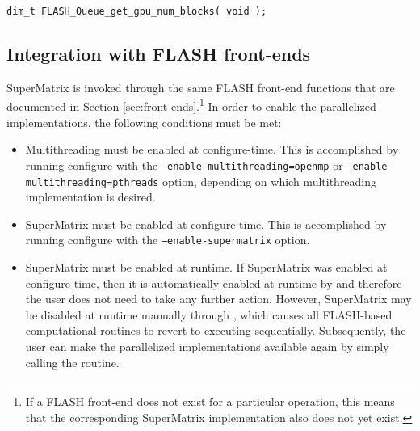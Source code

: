 
\begin{flaspec}
\begin{verbatim}
dim_t FLASH_Queue_get_gpu_num_blocks( void );
\end{verbatim}
\end{flaspec}







\subsection{Integration with FLASH front-ends}


SuperMatrix is invoked through the same FLASH front-end functions that
are documented in Section \ref{sec:front-ends}.\footnote{If a FLASH front-end
does not exist for a particular operation, this means that the corresponding
SuperMatrix implementation also does not yet exist.}
In order to enable the parallelized implementations, the following
conditions must be met:
\begin{itemize}

\item
Multithreading must be enabled at configure-time.
This is accomplished by running configure with the
{\tt --enable-multithreading=openmp} or
{\tt --enable-multithreading=pthreads} option, depending on which multithreading
implementation is desired.

\item
SuperMatrix must be enabled at configure-time.
This is accomplished by running configure with the
{\tt --enable-supermatrix} option.

\item
SuperMatrix must be enabled at runtime.
If SuperMatrix was enabled at configure-time, then it is automatically enabled
at runtime by \flainit and therefore the user does not need to take
any further action.
However, SuperMatrix may be disabled at runtime manually through
\flashqueuedisablens, which causes all FLASH-based
computational routines to revert to executing sequentially.
Subsequently, the user can make the parallelized implementations available
again by simply calling the \flashqueueenable
routine.

\end{itemize}

